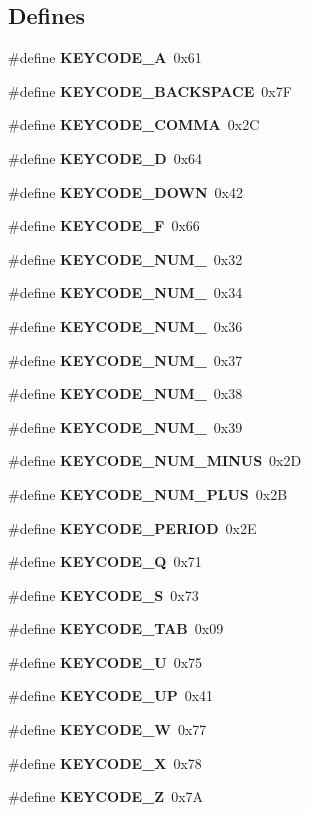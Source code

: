 \subsection*{\-Defines}
\begin{DoxyCompactItemize}
\item 
\#define {\bf \-K\-E\-Y\-C\-O\-D\-E\-\_\-\-A}~0x61
\item 
\#define {\bf \-K\-E\-Y\-C\-O\-D\-E\-\_\-\-B\-A\-C\-K\-S\-P\-A\-C\-E}~0x7\-F
\item 
\#define {\bf \-K\-E\-Y\-C\-O\-D\-E\-\_\-\-C\-O\-M\-M\-A}~0x2\-C
\item 
\#define {\bf \-K\-E\-Y\-C\-O\-D\-E\-\_\-\-D}~0x64
\item 
\#define {\bf \-K\-E\-Y\-C\-O\-D\-E\-\_\-\-D\-O\-W\-N}~0x42
\item 
\#define {\bf \-K\-E\-Y\-C\-O\-D\-E\-\_\-\-F}~0x66
\item 
\#define {\bf \-K\-E\-Y\-C\-O\-D\-E\-\_\-\-N\-U\-M\-\_}~0x32
\item 
\#define {\bf \-K\-E\-Y\-C\-O\-D\-E\-\_\-\-N\-U\-M\-\_}~0x34
\item 
\#define {\bf \-K\-E\-Y\-C\-O\-D\-E\-\_\-\-N\-U\-M\-\_}~0x36
\item 
\#define {\bf \-K\-E\-Y\-C\-O\-D\-E\-\_\-\-N\-U\-M\-\_}~0x37
\item 
\#define {\bf \-K\-E\-Y\-C\-O\-D\-E\-\_\-\-N\-U\-M\-\_}~0x38
\item 
\#define {\bf \-K\-E\-Y\-C\-O\-D\-E\-\_\-\-N\-U\-M\-\_}~0x39
\item 
\#define {\bf \-K\-E\-Y\-C\-O\-D\-E\-\_\-\-N\-U\-M\-\_\-\-M\-I\-N\-U\-S}~0x2\-D
\item 
\#define {\bf \-K\-E\-Y\-C\-O\-D\-E\-\_\-\-N\-U\-M\-\_\-\-P\-L\-U\-S}~0x2\-B
\item 
\#define {\bf \-K\-E\-Y\-C\-O\-D\-E\-\_\-\-P\-E\-R\-I\-O\-D}~0x2\-E
\item 
\#define {\bf \-K\-E\-Y\-C\-O\-D\-E\-\_\-\-Q}~0x71
\item 
\#define {\bf \-K\-E\-Y\-C\-O\-D\-E\-\_\-\-S}~0x73
\item 
\#define {\bf \-K\-E\-Y\-C\-O\-D\-E\-\_\-\-T\-A\-B}~0x09
\item 
\#define {\bf \-K\-E\-Y\-C\-O\-D\-E\-\_\-\-U}~0x75
\item 
\#define {\bf \-K\-E\-Y\-C\-O\-D\-E\-\_\-\-U\-P}~0x41
\item 
\#define {\bf \-K\-E\-Y\-C\-O\-D\-E\-\_\-\-W}~0x77
\item 
\#define {\bf \-K\-E\-Y\-C\-O\-D\-E\-\_\-\-X}~0x78
\item 
\#define {\bf \-K\-E\-Y\-C\-O\-D\-E\-\_\-\-Z}~0x7\-A
\end{DoxyCompactItemize}



